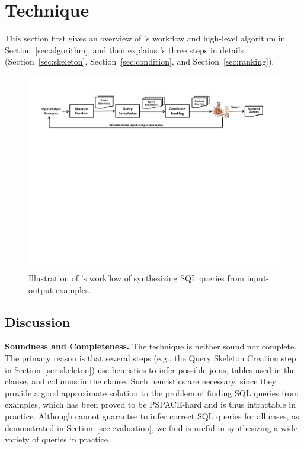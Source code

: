 
\section{Technique}
\label{sec:approach}

This section first gives an overview of \ourtool's
workflow and high-level algorithm in Section~\ref{sec:algorithm}, and
then explains \ourtool's three steps in details (Section~\ref{sec:skeleton},
Section~\ref{sec:condition}, and Section~\ref{sec:ranking}).



\begin{figure}[t]
  \centering
  \includegraphics[scale=0.70]{workflow}
  \vspace*{-1.0ex}\caption {{\label{fig:workflow} Illustration
  of \ourtool's workflow of synthesizing SQL queries from input-output examples. 
}}

\end{figure}










\subsection{Discussion}
\label{sec:uim}


\noindent \textbf{Soundness and Completeness.} The \ourtool
technique is neither sound nor complete. The primary
reason is that several steps (e.g., the Query Skeleton Creation
step in Section~\ref{sec:skeleton}) use heuristics
to infer possible joins, tables used in the  clause,
and columns in the  clause.
Such heuristics are necessary, since they provide a
good approximate solution to the problem of finding SQL queries
from examples, which has been proved to be
PSPACE-hard and is thus intractable in practice.
Although \ourtool cannot guarantee to infer correct SQL queries
for all cases, as demonstrated in Section~\ref{sec:evaluation},
we find \ourtool
is useful in synthesizing a wide variety of queries in practice.


